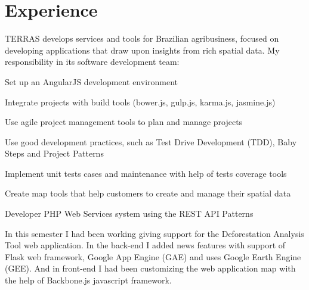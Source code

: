 \documentclass[]{joaosoares-resume}
\begin{document}
\begin{minipage}[t]{0.64\textwidth}

\section{Experience}

\sectionsep

TERRAS develops services and tools for Brazilian agribusiness, focused on developing applications that draw upon insights from rich spatial data. My responsibility in its software development team: 

\sectionsep
\begin{tightemize}
\item Set up an AngularJS development environment
\item Integrate projects with build tools (bower.js, gulp.js, karma.js, jasmine.js)
\item Use agile project management tools to plan and manage projects
\item Use good development practices, such as Test Drive Development (TDD), Baby Steps and Project Patterns
\item Implement unit tests cases and maintenance with help of tests coverage tools
\item Create map tools that help customers to create and manage their spatial data
\item Developer PHP Web Services system using the REST API Patterns
\end{tightemize}
\sectionsep

\sectionsep
In this semester I had been working giving support for the Deforestation Analysis Tool web application. In the back-end I added news features with support of Flask web framework,  Google App Engine (GAE) and uses Google Earth Engine (GEE). And in front-end I had been customizing the web application map with the help of Backbone.js javascript framework. 
\sectionsep


\end{minipage}
\end{document}

